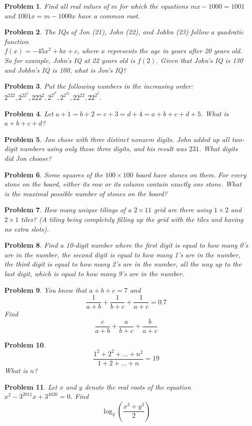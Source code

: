 \documentclass[a4paper,12pt]{article}
\theoremstyle{perfect}
\newtheorem{prb}{Problem}
\begin{document}
\begin{prb}
Find all real values of $m$ for which the equations $mx-1000=1001$ and $1001x = m - 1000x$ have a common root.
\end{prb}


\begin{prb}
The IQs of Jon (21), John (22), and Johhn (23) follow a quadratic function\\ $f(x) = -45x^2 + bx + c$, where $x$ represents the age in years after 20 years old. So for example, John's IQ at 22 years old is $f(2)$. Given that John's IQ is 130 and Johhn's IQ is 100, what is Jon's IQ?
\end{prb}


\begin{prb}
Put the following numbers in the increasing order: $2^{222}, 2^{22^2}, 222^2, 2^{2^{2^2}}, 2^{2^{22}}, 22^{22}, 22^{2^2}$. 
\end{prb}


\begin{prb}
Let $a + 1 = b + 2 = c + 3 = d + 4 = a + b + c + d + 5$. What is $a + b + c + d$?
\end{prb}


\begin{prb}
Jon chose with three distinct nonzero digits. John added up all two-digit numbers using only those three digits, and his result was $231$. What digits did Jon choose?
\end{prb}

\begin{prb}
Some squares of the $100\times 100$ board have stones on them. For every stone on the board, either its row or its column contain exactly one stone. What is the maximal possible number of stones on the board?
\end{prb}

\begin{prb}
How many unique tilings of a $2 \times 11$ grid are there using $1 \times 2$ and $2 \times 1$ tiles? (A tiling being completely filling up the grid with the tiles and having no extra slots).
\end{prb}

\begin{prb}
Find a 10-digit number where the first digit is equal to how many 0's are in the number, the second digit is equal to how many 1's are in the number, the third digit is equal to how many 2's are in the number, all the way up to the last digit, which is equal to how many 9's are in the number.
\end{prb}

\begin{prb}
You know that $a+b+c=7$ and $$\frac{1}{a+b} + \frac{1}{b+c} + \frac{1}{a+c} = 0.7$$ Find $$\frac{c}{a+b} + \frac{a}{b+c} + \frac{b}{a+c}$$
\end{prb}

\begin{prb}
$$\frac{1^2 + 2^2 + \ldots + n^2}{1 + 2 + \ldots + n} = 19$$
What is $n$?
\end{prb}


\begin{prb}
Let  $x$ and $y$ denote the real roots of the equation $x^2 - 3^{2011}x + 3^{4020} = 0$. Find $$\log_3\left(\frac{x^3 + y^3}{2}\right)$$
\end{prb}
\end{document}
